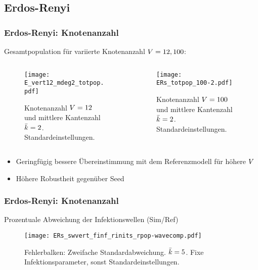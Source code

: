\subsection{Erdos-Renyi}

\begin{frame}[t]
    \frametitle{Erdos-Renyi: Knotenanzahl}
    Gesamtpopulation für variierte Knotenanzahl $V = 12, 100$: 
    \begin{columns}
        \begin{column}{0.5\textwidth}
    \begin{figure}[htpb]
        \centering
        \texttt{[image: E\_vert12\_mdeg2\_totpop.pdf]}
        \caption{Knotenanzahl $V=12$ und mittlere Kantenzahl $\bar{k} = 2$.
        Standardeinstellungen.}%
        \label{fig:E_vert12_mdeg2_totpop}
    \end{figure}
\end{column}
\begin{column}{0.5\textwidth}
    \begin{figure}[htpb]
        \centering
        \texttt{[image: ERs\_totpop\_100-2.pdf]}
        \caption{Knotenanzahl $V=100$ und mittlere Kantenzahl $\bar{k} = 2$.
        Standardeinstellungen.}%
        \label{fig:ERs_totpop_100-2-a}
    \end{figure}
\end{column}
\end{columns}
\begin{itemize}
    \item Geringfügig bessere Übereinstimmung mit dem Referenzmodell für höhere $V$
    \item Höhere Robustheit gegenüber Seed
\end{itemize}
\end{frame}
\begin{frame}[t]
    \frametitle{Erdos-Renyi: Knotenanzahl}
    Prozentuale Abweichung der Infektionswellen (Sim/Ref)
    \begin{figure}[htpb]
        \centering
        \texttt{[image: ERs\_swvert\_finf\_rinits\_rpop-wavecomp.pdf]}
        \caption{Fehlerbalken: Zweifache Standardabweichung. $\bar{k} = 5$. Fixe Infektionsparameter, sonst Standardeinstellungen.}%
        \label{fig:ERs_swvert_finf_rinits_rpop-wavecomp}
    \end{figure}


\end{frame}
